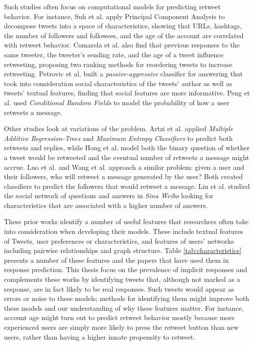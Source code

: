 Such studies often focus on computational models for predicting retweet behavior.  
For instance, Suh et al. \cite{Suh2010} apply Principal Component Analysis to decompose tweets into a space of characteristics, showing that URLs, hashtags, the number of followers and followees, and the age of the account are correlated with retweet behavior. 
Comarela et al. \cite{Comarela2012} also find that previous responses to the same tweeter, the tweeter's sending rate, and the age of a tweet influence retweeting, proposing two ranking methods for reordering tweets to increase retweeting.  
Petrovic et al. \cite{Petrovic2011} built a \textit{passive-aggressive} classifier for answering that took into consideration social characteristics of the tweets' author as well as tweets' textual features, finding that social features are more informative.  
Peng et al. \cite{Peng2011} used \textit{Conditional Random Fields} to model the probability of how a user retweets a message. 

Other studies look at variations of the problem.  
Artzi et al. \cite{Artzi2012} applied \textit{Multiple Additive Regression-Trees} and \textit{Maximum Entropy Classifiers} to predict both retweets and replies, while Hong et al. \cite{Hong2011} model both the binary question of whether a tweet would be retweeted and the eventual number of retweets a message might accrue.  
Luo et al. \cite{Luo2013} and Wang et al. \cite{Wang2012} approach a similar problem: given a user and their followers, who will retweet a message generated by the user?  Both created classifiers to predict the followers that would retweet a message.  
Liu et al. \cite{Liu2013} studied the social network of questions and answers in \textit{Sina Weibo} looking for characteristics that are associated with a higher number of answers.

These prior works identify a number of useful features that researchers often take into consideration when developing their models.  These include textual features of Tweets, user preferences or characteristics, and features of users' networks including pairwise relationships and graph structure.  Table \ref{tab:characteristics} presents a number of these features and the papers that have used them in response prediction.  This thesis focus on the prevalence of implicit responses and complements these works by identifying tweets that, although not marked as a response, are in fact likely to be real responses.  Such tweets would appear as errors or noise to these models; methods for identifying them might improve both these models and our understanding of why these features matter. For instance, account age might turn out to predict retweet behavior mostly because more experienced users are simply more likely to press the retweet button than new users, rather than having a higher innate propensity to retweet.

